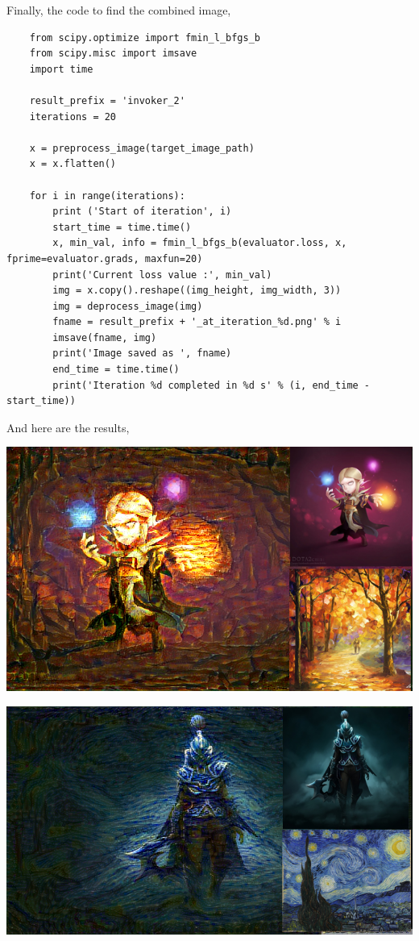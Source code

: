 \documentclass[graybox]{svmult}
\begin{document}
Finally, the code to find the combined image,

\begin{verbatim}
    from scipy.optimize import fmin_l_bfgs_b
    from scipy.misc import imsave
    import time

    result_prefix = 'invoker_2'
    iterations = 20

    x = preprocess_image(target_image_path)
    x = x.flatten()

    for i in range(iterations):
        print ('Start of iteration', i)
        start_time = time.time()
        x, min_val, info = fmin_l_bfgs_b(evaluator.loss, x, fprime=evaluator.grads, maxfun=20)
        print('Current loss value :', min_val)
        img = x.copy().reshape((img_height, img_width, 3))
        img = deprocess_image(img)
        fname = result_prefix + '_at_iteration_%d.png' % i
        imsave(fname, img)
        print('Image saved as ', fname)
        end_time = time.time()
        print('Iteration %d completed in %d s' % (i, end_time - start_time))
\end{verbatim}

And here are the results,

\includegraphics[width=\textwidth]{invo_combined.png}

\includegraphics[width=\textwidth]{pa_combined.png}
\end{document}
